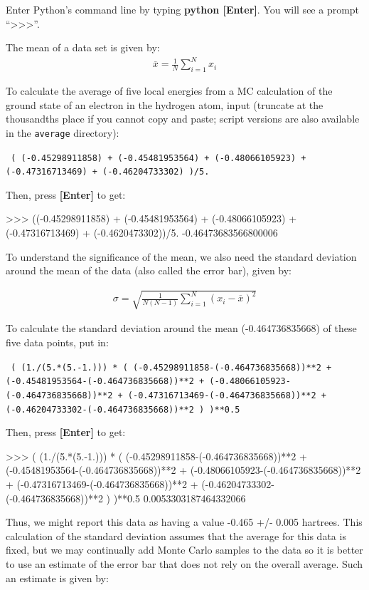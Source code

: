 Enter Python's command line by typing \textbf{python [Enter]}.
You will see a prompt ``\textgreater\textgreater\textgreater''.

The mean of a data set is given by:
\begin{align}
  \overline{x} = \frac{1}{N}\sum_{i=1}^{N} x_i
\end{align}

To calculate the average of five local energies from a MC calculation of the
ground state of an electron in the hydrogen atom, input (truncate at the
thousandths place if you cannot copy and paste; script versions are also
available in the \texttt{average} directory): 

\texttt{
(
(-0.45298911858) + 
(-0.45481953564) + 
(-0.48066105923) + 
(-0.47316713469) + 
(-0.46204733302)
)/5.
} 

Then, press \textbf{[Enter]} to get:

\begin{shade}
>>> ((-0.45298911858) + (-0.45481953564) + (-0.48066105923) + 
(-0.47316713469) + (-0.4620473302))/5.  
-0.46473683566800006
\end{shade}

To understand the significance of the mean, we also need the standard deviation
around the mean of the data (also called the error bar), given by:

\begin{align}
  \sigma = \sqrt{\frac{1}{N(N-1)}\sum_{i=1}^{N} ({x_i} - \overline{x})^2}
\end{align}

To calculate the standard deviation around the mean (-0.464736835668) of these
five data points, put in: 

\texttt{
( (1./(5.*(5.-1.))) * ( 
(-0.45298911858-(-0.464736835668))**2 + \\
(-0.45481953564-(-0.464736835668))**2 + 
(-0.48066105923-(-0.464736835668))**2 + 
(-0.47316713469-(-0.464736835668))**2 + 
(-0.46204733302-(-0.464736835668))**2 ) 
)**0.5
} 

Then, press \textbf{[Enter]} to get:

\begin{shade}
>>> ( (1./(5.*(5.-1.))) * ( (-0.45298911858-(-0.464736835668))**2 +
(-0.45481953564-(-0.464736835668))**2 + (-0.48066105923-(-0.464736835668))**2 + 
(-0.47316713469-(-0.464736835668))**2 + (-0.46204733302-(-0.464736835668))**2 
) )**0.5
0.0053303187464332066
\end{shade}

Thus, we might report this data as having a value -0.465 +/- 0.005 hartrees.
This calculation of the standard deviation assumes that the average for this
data is fixed, but we may continually add Monte Carlo samples to the data so it
is better to use an estimate of the error bar that does not rely on the overall
average.  Such an estimate is given by:

